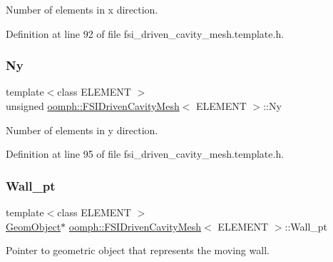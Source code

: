Number of elements in x direction. 



Definition at line 92 of file fsi\+\_\+driven\+\_\+cavity\+\_\+mesh.\+template.\+h.

\mbox{\label{classoomph_1_1FSIDrivenCavityMesh_af80a5662c2f61ebe49caba4ab08886b9}} 
\subsubsection{\texorpdfstring{Ny}{Ny}}
{\footnotesize\ttfamily template$<$class E\+L\+E\+M\+E\+NT $>$ \\
unsigned \hyperlink{classoomph_1_1FSIDrivenCavityMesh}{oomph\+::\+F\+S\+I\+Driven\+Cavity\+Mesh}$<$ E\+L\+E\+M\+E\+NT $>$\+::Ny\hspace{0.3cm}{\ttfamily [protected]}}



Number of elements in y direction. 



Definition at line 95 of file fsi\+\_\+driven\+\_\+cavity\+\_\+mesh.\+template.\+h.

\mbox{\label{classoomph_1_1FSIDrivenCavityMesh_a4f05e03a223ac1f8370bdd39c56a5638}} 
\subsubsection{\texorpdfstring{Wall\+\_\+pt}{Wall\_pt}}
{\footnotesize\ttfamily template$<$class E\+L\+E\+M\+E\+NT $>$ \\
\hyperlink{classoomph_1_1GeomObject}{Geom\+Object}$\ast$ \hyperlink{classoomph_1_1FSIDrivenCavityMesh}{oomph\+::\+F\+S\+I\+Driven\+Cavity\+Mesh}$<$ E\+L\+E\+M\+E\+NT $>$\+::Wall\+\_\+pt\hspace{0.3cm}{\ttfamily [protected]}}



Pointer to geometric object that represents the moving wall. 



